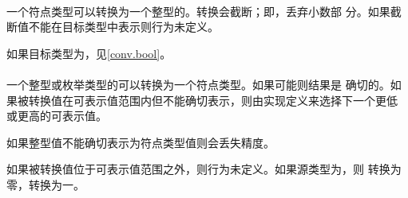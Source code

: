 \paragraph{} %
一个符点类型\prvalue{}可以转换为一个整型的\prvalue{}。转换会截断；即，丢弃小数部
分。如果截断值不能在目标类型中表示则行为未定义。

\begin{note}
  如果目标类型为，见\ref{conv.bool}。
\end{note}

\paragraph{} %
一个整型或枚举类型的\prvalue{}可以转换为一个符点类型\prvalue{}。如果可能则结果是
确切的。如果被转换值在可表示值范围内但不能确切表示，则由实现定义来选择下一个更低
或更高的可表示值。

\begin{note}
  如果整型值不能确切表示为符点类型值则会丢失精度。
\end{note}

如果被转换值位于可表示值范围之外，则行为未定义。如果源类型为，则
转换为零，转换为一。
